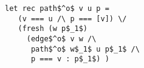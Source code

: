 \begin{figure}[!t]
    \begin{lstlisting}[language=ocanren]
 let rec path$^o$ v u p = 
   (v === u /\ p === [v]) \/
   (fresh (w p$_1$)
     (edge$^o$ v w /\
      path$^o$ w$_1$ u p$_1$ /\
      p === v : p$_1$) )
    \end{lstlisting}
\end{figure}